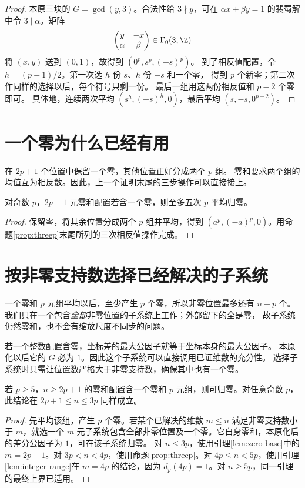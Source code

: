 \begin{proof}
本原三块的 $G=\gcd(y,3)$。合法性给 $3\nmid y$，可在 $\alpha x+\beta y=1$ 的裴蜀解中令 $3\mid\alpha$。矩阵
\[
\begin{pmatrix}y&-x\\\alpha&\beta\end{pmatrix}\in\Gamma_0(3,\Z)
\]
将 $(x,y)$ 送到 $(0,1)$，故得到 $(0^p,s^p,(-s)^p)$。
到了相反值配置，令 $h=(p-1)/2$。第一次选 $h$ 份 $s$、$h$ 份 $-s$ 和一个零，
得到 $p$ 个新零；第二次作同样的选择以后，每个符号只剩一份。
最后一组用这两份相反值和 $p-2$ 个零即可。
具体地，连续两次平均 $(s^h,(-s)^h,0)$，最后平均 $(s,-s,0^{p-2})$。
\end{proof}


\section{一个零为什么已经有用}
在 $2p+1$ 个位置中保留一个零，其他位置正好分成两个 $p$ 组。
零和要求两个组的均值互为相反数。因此，上一个证明末尾的三步操作可以直接接上。

\begin{lemma}\label{lem:zero-base}
对奇数 $p$，$2p+1$ 元零和配置若含一个零，则至多五次 $p$ 平均归零。
\end{lemma}
\begin{proof}
保留零，将其余位置分成两个 $p$ 组并平均，得到 $(a^p,(-a)^p,0)$。用命题\ref{prop:threep}末尾所列的三次相反值操作完成。
\end{proof}


\section{按非零支持数选择已经解决的子系统}
一个零和 $p$ 元组平均以后，至少产生 $p$ 个零，所以非零位置最多还有 $n-p$ 个。
我们只在一个包含\emph{全部}非零位置的子系统上工作；外部留下的全是零，
故子系统仍然零和，也不会有缩放尺度不同步的问题。

若一个整数配置含零，坐标差的最大公因子就等于坐标本身的最大公因子。
本原化以后它的 $G$ 必为 $1$。因此这个子系统可以直接调用已证维数的充分性。
选择子系统时只需让位置数严格大于非零支持数，确保其中也有一个零。

\begin{lemma}[从一个零和组到全部归零]\label{lem:zero-tail}
若 $p\ge5$，$n\ge2p+1$ 的零和配置含一个零和 $p$ 元组，则可归零。对任意奇数 $p$，此结论在 $2p+1\le n\le3p$ 同样成立。
\end{lemma}
\begin{proof}
先平均该组，产生 $p$ 个零。若某个已解决的维数 $m\le n$ 满足非零支持数小于 $m$，就选一个 $m$ 元子系统包含全部非零位置及一个零。它自身零和，本原化后的差分公因子为 $1$，可在该子系统归零。
对 $n\le3p$，使用引理\ref{lem:zero-base}中的 $m=2p+1$。对 $3p<n<4p$，使用命题\ref{prop:threep}。对 $4p\le n<5p$，使用引理\ref{lem:integer-range}在 $m=4p$ 的结论，因为 $d_p(4p)=1$。对 $n\ge5p$，同一引理的最终上界已适用。
\end{proof}

